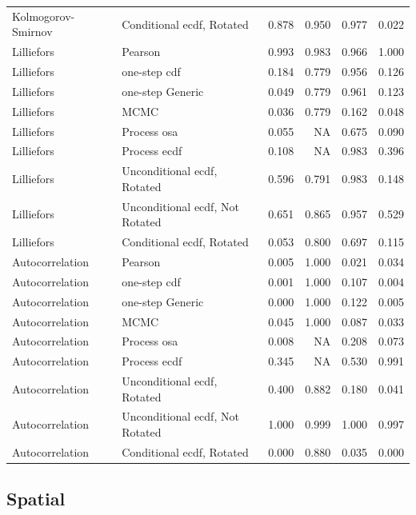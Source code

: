 \documentclass[
]{article}
\begin{document}
\begin{table}[H]
\begin{tabular}[t]{llrrrr}
Kolmogorov- Smirnov & Conditional ecdf, Rotated & 0.878 & 0.950 & 0.977 & 0.022\\
Lilliefors & Pearson & 0.993 & 0.983 & 0.966 & 1.000\\
Lilliefors & one-step cdf & 0.184 & 0.779 & 0.956 & 0.126\\
\addlinespace
Lilliefors & one-step Generic & 0.049 & 0.779 & 0.961 & 0.123\\
Lilliefors & MCMC & 0.036 & 0.779 & 0.162 & 0.048\\
Lilliefors & Process osa & 0.055 & NA & 0.675 & 0.090\\
Lilliefors & Process ecdf & 0.108 & NA & 0.983 & 0.396\\
Lilliefors & Unconditional ecdf, Rotated & 0.596 & 0.791 & 0.983 & 0.148\\
\addlinespace
Lilliefors & Unconditional ecdf, Not Rotated & 0.651 & 0.865 & 0.957 & 0.529\\
Lilliefors & Conditional ecdf, Rotated & 0.053 & 0.800 & 0.697 & 0.115\\
Autocorrelation & Pearson & 0.005 & 1.000 & 0.021 & 0.034\\
Autocorrelation & one-step cdf & 0.001 & 1.000 & 0.107 & 0.004\\
Autocorrelation & one-step Generic & 0.000 & 1.000 & 0.122 & 0.005\\
\addlinespace
Autocorrelation & MCMC & 0.045 & 1.000 & 0.087 & 0.033\\
Autocorrelation & Process osa & 0.008 & NA & 0.208 & 0.073\\
Autocorrelation & Process ecdf & 0.345 & NA & 0.530 & 0.991\\
Autocorrelation & Unconditional ecdf, Rotated & 0.400 & 0.882 & 0.180 & 0.041\\
Autocorrelation & Unconditional ecdf, Not Rotated & 1.000 & 0.999 & 1.000 & 0.997\\
\addlinespace
Autocorrelation & Conditional ecdf, Rotated & 0.000 & 0.880 & 0.035 & 0.000\\
\bottomrule
\end{tabular}
\end{table}

\subsection{Spatial}\label{spatial}
\end{document}
